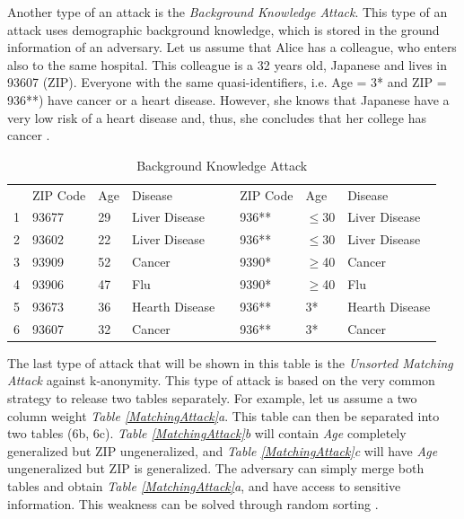 \documentclass{llncs}
\begin{document}
Another type of an attack is the \textit{Background Knowledge Attack}. This type of an attack uses demographic background knowledge, which is stored in the ground information of an adversary. Let us assume that Alice has a colleague, who enters also to the same hospital. This colleague is a 32 years old, Japanese and lives in 93607 (ZIP). Everyone with the same quasi-identifiers, i.e. Age = 3* and ZIP = 936**) have cancer or a heart disease. However, she knows that Japanese have a very low risk of a heart disease and, thus, she concludes that her college has cancer \cite{ldiversity}.
\begin{table}[]
	\centering
	\caption{Background Knowledge Attack}
	\label{tablebackground}
	\begin{tabular}{@{}llllllll@{}}
		\cmidrule(r){1-4} \cmidrule(l){6-8}
		& ZIP Code & Age & Disease        &  & ZIP Code & Age      & Disease        \\ \cmidrule(r){1-4} \cmidrule(l){6-8} 
		1 & 93677    & 29  & Liver Disease   &  & 936**    & $\leq$30 & Liver Disease   \\
		2 & 93602    & 22  & Liver Disease   &  & 936**    & $\leq$30 & Liver Disease   \\
		3 & 93909    & 52  & Cancer         &  & 9390*    & $\geq$40 & Cancer         \\
		4 & 93906    & 47  & Flu            &  & 9390*    & $\geq$40 & Flu            \\
		5 & 93673    & 36  & Hearth Disease &  & 936**    & 3*       & Hearth Disease \\
		6 & 93607    & 32  & Cancer         &  & 936**    & 3*       & Cancer         \\ \cmidrule(r){1-4} \cmidrule(l){6-8} 
	\end{tabular}
\end{table}

The last type of attack that will be shown in this table is the \textit{Unsorted Matching Attack} against k-anonymity. This type of attack is based on the very common strategy to release two tables separately. For example, let us assume a two column weight \textit{Table \ref{MatchingAttack}a}. This table can then be separated into two tables (6b, 6c). \textit{Table \ref{MatchingAttack}b} will contain \textit{Age} completely generalized but ZIP ungeneralized, and \textit{Table \ref{MatchingAttack}c} will have \textit{Age} ungeneralized but ZIP is generalized. The adversary can simply merge both tables and obtain \textit{Table \ref{MatchingAttack}a}, and have access to sensitive information. This weakness can be solved through random sorting \cite{meyerson2004complexity}.
\end{document}
